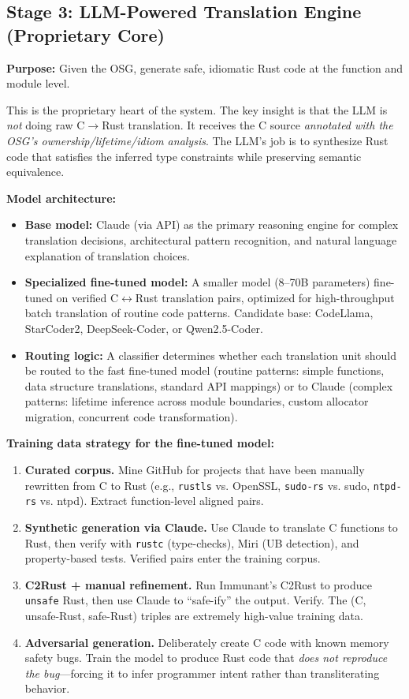 \documentclass[11pt,a4paper]{article}
\theoremstyle{definition}
\theoremstyle{remark}
\begin{document}
\subsection{Stage 3: LLM-Powered Translation Engine (Proprietary Core)}

\textbf{Purpose:} Given the OSG, generate safe, idiomatic Rust code at the function and module level.

This is the proprietary heart of the system. The key insight is that the LLM is \textit{not} doing raw C$\to$Rust translation. It receives the C source \textit{annotated with the OSG's ownership/lifetime/idiom analysis}. The LLM's job is to synthesize Rust code that satisfies the inferred type constraints while preserving semantic equivalence.

\textbf{Model architecture:}
\begin{itemize}[leftmargin=2em]
\item \textbf{Base model:} Claude (via API) as the primary reasoning engine for complex translation decisions, architectural pattern recognition, and natural language explanation of translation choices.
\item \textbf{Specialized fine-tuned model:} A smaller model (8--70B parameters) fine-tuned on verified C$\leftrightarrow$Rust translation pairs, optimized for high-throughput batch translation of routine code patterns. Candidate base: CodeLlama, StarCoder2, DeepSeek-Coder, or Qwen2.5-Coder.
\item \textbf{Routing logic:} A classifier determines whether each translation unit should be routed to the fast fine-tuned model (routine patterns: simple functions, data structure translations, standard API mappings) or to Claude (complex patterns: lifetime inference across module boundaries, custom allocator migration, concurrent code transformation).
\end{itemize}

\textbf{Training data strategy for the fine-tuned model:}

\begin{enumerate}[leftmargin=2em]
\item \textbf{Curated corpus.} Mine GitHub for projects that have been manually rewritten from C to Rust (e.g., \texttt{rustls} vs. OpenSSL, \texttt{sudo-rs} vs. sudo, \texttt{ntpd-rs} vs. ntpd). Extract function-level aligned pairs.
\item \textbf{Synthetic generation via Claude.} Use Claude to translate C functions to Rust, then verify with \texttt{rustc} (type-checks), Miri (UB detection), and property-based tests. Verified pairs enter the training corpus.
\item \textbf{C2Rust + manual refinement.} Run Immunant's C2Rust to produce \texttt{unsafe} Rust, then use Claude to ``safe-ify'' the output. Verify. The (C, unsafe-Rust, safe-Rust) triples are extremely high-value training data.
\item \textbf{Adversarial generation.} Deliberately create C code with known memory safety bugs. Train the model to produce Rust code that \textit{does not reproduce the bug}---forcing it to infer programmer intent rather than transliterating behavior.
\end{enumerate}
\end{document}
